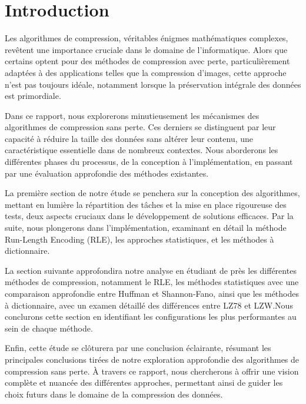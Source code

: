\section{Introduction}

Les algorithmes de compression, véritables énigmes mathématiques complexes, revêtent une importance cruciale dans le domaine de l'informatique. Alors que certains optent pour des méthodes de compression avec perte, particulièrement adaptées à des applications telles que la compression d'images, cette approche n'est pas toujours idéale, notamment lorsque la préservation intégrale des données est primordiale.

\bigskip

Dans ce rapport, nous explorerons minutieusement les mécanismes des algorithmes de compression sans perte. Ces derniers se distinguent par leur capacité à réduire la taille des données sans altérer leur contenu, une caractéristique essentielle dans de nombreux contextes. Nous aborderons les différentes phases du processus, de la conception à l'implémentation, en passant par une évaluation approfondie des méthodes existantes.

\bigskip

La première section de notre étude se penchera sur la conception des algorithmes, mettant en lumière la répartition des tâches et la mise en place rigoureuse des tests, deux aspects cruciaux dans le développement de solutions efficaces. Par la suite, nous plongerons dans l'implémentation, examinant en détail la méthode Run-Length Encoding (RLE), les approches statistiques, et les méthodes à dictionnaire.

\medskip

La section suivante approfondira notre analyse en étudiant de près les différentes méthodes de compression, notamment le RLE, les méthodes statistiques avec une comparaison approfondie entre Huffman et Shannon-Fano, ainsi que les méthodes à dictionnaire, avec un examen détaillé des différences entre LZ78 et LZW.\@ Nous conclurons cette section en identifiant les configurations les plus performantes au sein de chaque méthode.

\medskip

Enfin, cette étude se clôturera par une conclusion éclairante, résumant les principales conclusions tirées de notre exploration approfondie des algorithmes de compression sans perte. À travers ce rapport, nous chercherons à offrir une vision complète et nuancée des différentes approches, permettant ainsi de guider les choix futurs dans le domaine de la compression des données.